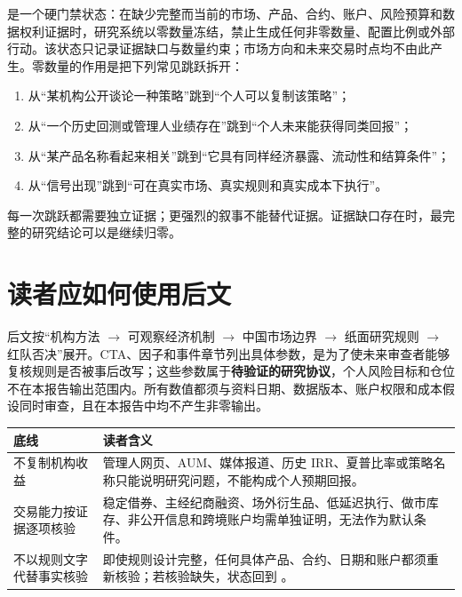 \qzero{} 是一个硬门禁状态：在缺少完整而当前的市场、产品、合约、账户、风险预算和数据权利证据时，研究系统以零数量冻结，禁止生成任何非零数量、配置比例或外部行动。该状态只记录证据缺口与数量约束；市场方向和未来交易时点均不由此产生。零数量的作用是把下列常见跳跃拆开：

\begin{enumerate}
  \item 从“某机构公开谈论一种策略”跳到“个人可以复制该策略”；
  \item 从“一个历史回测或管理人业绩存在”跳到“个人未来能获得同类回报”；
  \item 从“某产品名称看起来相关”跳到“它具有同样经济暴露、流动性和结算条件”；
  \item 从“信号出现”跳到“可在真实市场、真实规则和真实成本下执行”。
\end{enumerate}

每一次跳跃都需要独立证据；更强烈的叙事不能替代证据。证据缺口存在时，最完整的研究结论可以是继续归零。

\section{读者应如何使用后文}

后文按“机构方法 $\rightarrow$ 可观察经济机制 $\rightarrow$ 中国市场边界 $\rightarrow$ 纸面研究规则 $\rightarrow$ 红队否决”展开。CTA、因子和事件章节列出具体参数，是为了使未来审查者能够复核规则是否被事后改写；这些参数属于\textbf{待验证的研究协议}，个人风险目标和仓位不在本报告输出范围内。所有数值都须与资料日期、数据版本、账户权限和成本假设同时审查，且在本报告中均不产生非零输出。

\begin{dashboardbox}[三条不可突破的底线]
\begin{tabularx}{\textwidth}{L{3.3cm}X}
\toprule
\textbf{底线} & \textbf{读者含义} \\
\midrule
不复制机构收益 & 管理人网页、AUM、媒体报道、历史 IRR、夏普比率或策略名称只能说明研究问题，不能构成个人预期回报。 \\
交易能力按证据逐项核验 & 稳定借券、主经纪商融资、场外衍生品、低延迟执行、做市库存、非公开信息和跨境账户均需单独证明，无法作为默认条件。 \\
不以规则文字代替事实核验 & 即使规则设计完整，任何具体产品、合约、日期和账户都须重新核验；若核验缺失，状态回到 \qzero{}。 \\
\bottomrule
\end{tabularx}
\end{dashboardbox}

